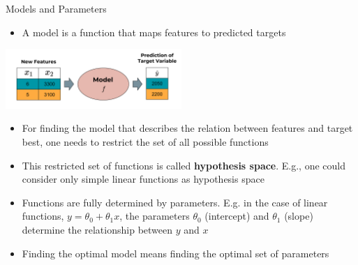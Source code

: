 \documentclass[11pt,compress,t,notes=noshow, xcolor=table]{beamer}
\begin{document}
\begin{vbframe}{Models and Parameters}
\small
\begin{itemize}
    \item A model is a function that maps features to predicted targets
\end{itemize}

\begin{center}
  \includegraphics[width = 0.5\textwidth]{figure_man/the_model_web.png}
\end{center}

\small
\begin{itemize}
\item  For finding the model that describes the relation between features and target best, one needs to restrict the set of all possible functions
\item This restricted set of functions is called \textbf{hypothesis space}. E.g., one could consider only simple linear functions as hypothesis space
\item Functions are fully determined by parameters. E.g. in the case of linear functions, $y = \theta_0 + \theta_1 x $, the parameters $\theta_0$ (intercept) and $\theta_1$ (slope) determine the relationship between $y$ and $x$
\item Finding the optimal model means finding the optimal set of parameters
\end{itemize}

\end{vbframe}
\end{document}
